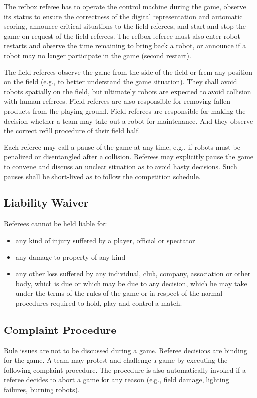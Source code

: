 \documentclass[12pt,twoside]{article}
\begin{document}
The refbox referee has to operate the control machine during the game,
observe its status to ensure the correctness of the digital
representation and automatic scoring, announce critical situations to
the field referees, and start and stop the game on request of the
field referees. The refbox referee must also enter robot restarts and
observe the time remaining to bring back a robot, or announce if a
robot may no longer participate in the game (second restart).

The field referees observe the game from the side of the field or from
any position on the field (e.g., to better understand the game
situation). They shall avoid robots spatially on the field, but
ultimately robots are expected to avoid collision with human
referees. Field referees are also responsible for removing fallen
products from the playing-ground. Field referees are responsible for
making the decision whether a team may take out a robot for
maintenance. And they observe the correct refill procedure of their
field half.

Each referee may call a pause of the game at any time, e.g., if robots
must be penalized or disentangled after a collision. Referees may
explicitly pause the game to convene and discuss an unclear situation
as to avoid hasty decisions. Such pauses shall be short-lived as to
follow the competition schedule.

\subsection{Liability Waiver}
Referees cannot be held liable for:
\begin{itemize}
\item any kind of injury suffered by a player, official or spectator
\item any damage to property of any kind
\item any other loss suffered by any individual, club, company,
  association or other body, which is due or which may be due to any
  decision, which he may take under the terms of the rules of the game
  or in respect of the normal procedures required to hold, play and
  control a match.
\end{itemize}

\subsection{Complaint Procedure}
Rule issues are not to be discussed during a game. Referee decisions
are binding for the game. A team may protest and challenge a game by
executing the following complaint procedure. The procedure is also
automatically invoked if a referee decides to abort a game for any
reason (e.g., field damage, lighting failures, burning robots).
\end{document}
